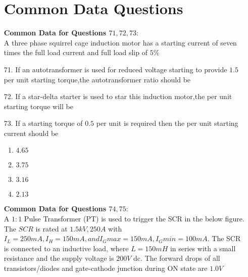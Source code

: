 \documentclass[journal,12pt,onecolumn]{IEEEtran}
\theoremstyle{remark}
\begin{document}
\begin{enumerate}
\section{Common Data Questions}
\textbf{Common Data for Questions $71,72,73:$} \\
A three phase squirrel cage induction motor has a starting current of seven times the full load current and full load slip of $5\%$

    \item [71.] If an autotransformer is used for reduced voltage starting to provide $1.5$ per unit starting torque,the autotransformer ratio \brak{\%} should be
        \begin{enumerate}    
       \end{enumerate}
    \item  [72.] If a star-delta starter is used to star this induction motor,the per unit starting torque will be
        \begin{enumerate}
               \end{enumerate}

    \item [73.]If a starting torque of $0.5$ per unit is required then the per unit starting current should be 
        \begin{multicols}{4}
            \begin{enumerate}
                \item $4.65$ 
                \item $3.75$ 
                \item $3.16$
                \item $2.13$
            \end{enumerate}
        \end{multicols}
\textbf{Common Data for Questions $74,75:$} \\    
   A $1:1$ Pulse Transformer (PT) is used to trigger the SCR in the below figure. The $SCR$ is rated at $1.5 kV, 250 A$ with $I_L=250 mA, I_H=150 mA, and I_Gmax=150 mA, I_Gmin=100 mA$. The SCR is connected to an inductive load, where $L = 150 mH$ in series with a small resistance and the supply voltage is $200 V$ dc. The forward drops of all transistors/diodes and gate-cathode junction during ON state are $1.0 V$ 
   

\end{enumerate}
\end{document}
